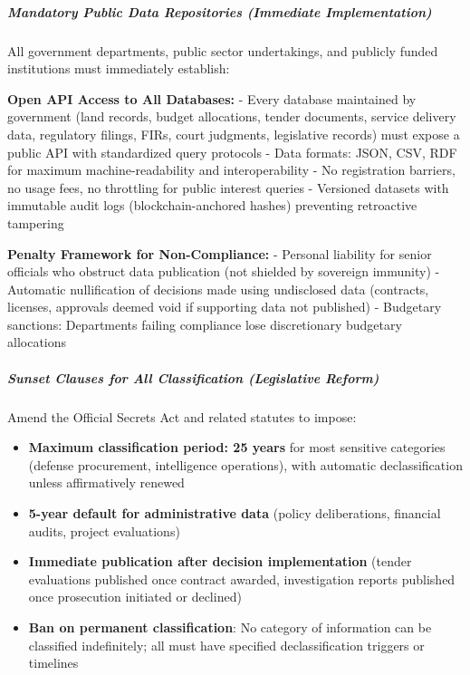 \subparagraph{Mandatory Public Data Repositories (Immediate
Implementation)}\label{mandatory-public-data-repositories-immediate-implementation}

All government departments, public sector undertakings, and publicly
funded institutions must immediately establish:

\textbf{Open API Access to All Databases:} - Every database maintained
by government (land records, budget allocations, tender documents,
service delivery data, regulatory filings, FIRs, court judgments,
legislative records) must expose a public API with standardized query
protocols - Data formats: JSON, CSV, RDF for maximum machine-readability
and interoperability - No registration barriers, no usage fees, no
throttling for public interest queries - Versioned datasets with
immutable audit logs (blockchain-anchored hashes) preventing retroactive
tampering

\textbf{Penalty Framework for Non-Compliance:} - Personal liability for
senior officials who obstruct data publication (not shielded by
sovereign immunity) - Automatic nullification of decisions made using
undisclosed data (contracts, licenses, approvals deemed void if
supporting data not published) - Budgetary sanctions: Departments
failing compliance lose discretionary budgetary allocations

\subparagraph{Sunset Clauses for All Classification (Legislative
Reform)}\label{sunset-clauses-for-all-classification-legislative-reform}

Amend the Official Secrets Act and related statutes to impose:

\begin{itemize}
\tightlist
\item
  \textbf{Maximum classification period: 25 years} for most sensitive
  categories (defense procurement, intelligence operations), with
  automatic declassification unless affirmatively renewed
\item
  \textbf{5-year default for administrative data} (policy deliberations,
  financial audits, project evaluations)
\item
  \textbf{Immediate publication after decision implementation} (tender
  evaluations published once contract awarded, investigation reports
  published once prosecution initiated or declined)
\item
  \textbf{Ban on permanent classification}: No category of information
  can be classified indefinitely; all must have specified
  declassification triggers or timelines
\end{itemize}

